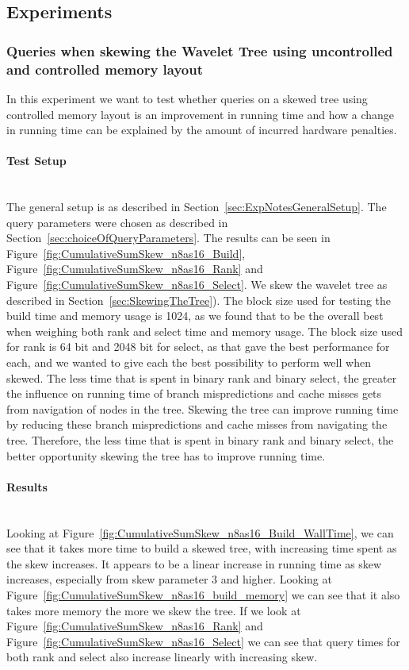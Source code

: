 \subsection{Experiments}

\subsubsection{Queries when skewing the Wavelet Tree using uncontrolled and controlled memory layout}
In this experiment we want to test whether queries on a skewed tree using controlled memory layout is an improvement in running time and how a change in running time can be explained by the amount of incurred hardware penalties.

\paragraph{Test Setup}~\\
The general setup is as described in Section~\ref{sec:ExpNotesGeneralSetup}.
The query parameters were chosen as described in Section~\ref{sec:choiceOfQueryParameters}.
The results can be seen in Figure~\ref{fig:CumulativeSumSkew_n8as16_Build}, Figure~\ref{fig:CumulativeSumSkew_n8as16_Rank} and Figure~\ref{fig:CumulativeSumSkew_n8as16_Select}.
We skew the wavelet tree as described in Section~\ref{sec:SkewingTheTree}).
The block size used for testing the build time and memory usage is 1024, as we found that to be the overall best when weighing both rank and select time and memory usage.
The block size used for rank is 64 bit and 2048 bit for select, as that gave the best performance for each, and we wanted to give each the best possibility to perform well when skewed.
The less time that is spent in binary rank and binary select, the greater the influence on running time of branch mispredictions and cache misses gets from navigation of nodes in the tree. 
Skewing the tree can improve running time by reducing these branch mispredictions and cache misses from navigating the tree.
Therefore, the less time that is spent in binary rank and binary select, the better opportunity skewing the tree has to improve running time.

\paragraph{Results}~\\
Looking at Figure~\ref{fig:CumulativeSumSkew_n8as16_Build_WallTime}, we can see that it takes more time to build a skewed tree, with increasing time spent as the skew increases.
It appears to be a linear increase in running time as skew increases, especially from skew parameter 3 and higher.
Looking at Figure~\ref{fig:CumulativeSumSkew_n8as16_build_memory} we can see that it also takes more memory the more we skew the tree.
If we look at Figure~\ref{fig:CumulativeSumSkew_n8as16_Rank} and Figure~\ref{fig:CumulativeSumSkew_n8as16_Select} we can see that query times for both rank and select also increase linearly with increasing skew.

